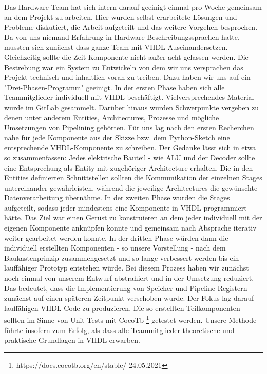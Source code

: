 \documentclass[paper=a4,fontsize=12pt,twocolumn]{scrreprt}
\begin{document}
Das Hardware Team hat sich intern darauf geeinigt einmal pro Woche gemeinsam an dem Projekt zu arbeiten. 
Hier wurden selbst erarbeitete Lösungen und Probleme diskutiert, die Arbeit aufgeteilt und das weitere Vorgehen besprochen.
Da von uns niemand Erfahrung in Hardware-Beschreibungssprachen hatte, mussten sich zunächst dass ganze Team mit VHDL Auseinandersetzen.
Gleichzeitig sollte die Zeit Komponente nicht außer acht gelassen werden.
Die Bestrebung war ein System zu Entwickeln von dem wir uns versprachen das Projekt technisch und inhaltlich voran zu treiben.
Dazu haben wir uns auf ein "Drei-Phasen-Programm" geeinigt. In der ersten Phase haben sich alle Teammitglieder individuell mit VHDL beschäftigt.
Vielversprechendes Material wurde im GitLab gesammelt.
Darüber hinaus wurden Schwerpunkte vergeben zu denen unter anderem Entities, Architectures, Prozesse und mögliche Umsetzungen von Pipelining gehörten.
Für uns lag nach den ersten Recherchen nahe für jede Komponente aus der Skizze bzw. dem Python-Sketch eine entsprechende VHDL-Komponente zu schreiben.
Der Gedanke lässt sich in etwa so zusammenfassen: Jedes elektrische Bauteil - wie ALU und der Decoder sollte eine Entsprechung als Entity mit zugehöriger Architecture erhalten.
Die in den Entities definierten Schnittstellen sollten die Kommunikation der einzelnen Stages untereinander gewährleisten, während die jeweilige Architectures die gewünschte Datenverarbeitung übernähme.
In der zweiten Phase wurden die Stages aufgeteilt, sodass jeder mindestens eine Komponente in VHDL programmiert hätte.
Das Ziel war einen Gerüst zu konstruieren an dem jeder individuell mit der eigenen Komponente anknüpfen konnte und gemeinsam nach Absprache iterativ weiter gearbeitet werden konnte.
In der dritten Phase würden dann die individuell erstellten Komponenten - so unsere Vorstellung - nach dem Baukastenprinzip zusammengesetzt und so lange verbessert werden bis ein lauffähiger Prototyp entstehen würde.
Bei diesem Prozess haben wir zunächst noch einmal von unserem Entwurf abstrahiert und in der Umsetzung reduziert.
Das bedeutet, dass die Implementierung von Speicher und Pipeline-Registern zunächst auf einen späteren Zeitpunkt verschoben wurde.
Der Fokus lag darauf lauffähigen VHDL-Code zu produzieren.
Die so erstellten Teilkomponenten sollten im Sinne von Unit-Tests mit CocoTb \footnote{https://docs.cocotb.org/en/stable/ 24.05.2021} getestet werden.
Unsere Methode führte insofern zum Erfolg, als dass alle Teammitglieder theoretische und praktische Grundlagen in VHDL erwarben.
\end{document}

